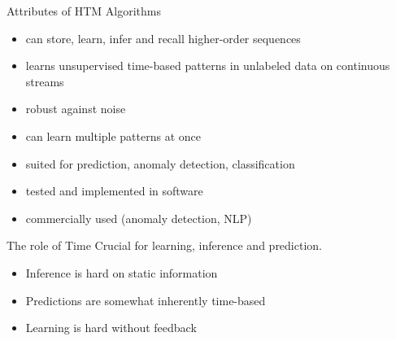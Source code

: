 \begin{frame}[c]{Attributes of HTM Algorithms}
    \begin{itemize}[<+(1)->]
        \item can store, learn, infer and recall higher-order sequences
        \item learns unsupervised time-based patterns in unlabeled data on continuous streams
        \item robust against noise
        \item can learn multiple patterns at once
        \item suited for prediction, anomaly detection, classification
        \item tested and implemented in software
        \item commercially used (anomaly detection, NLP)
    \end{itemize}
\end{frame}



\begin{frame}[c]{The role of Time}
    \Large
    Crucial for learning, inference and prediction.
    \begin{itemize}[<+(1)->]
        \item Inference is hard on static information
        \item Predictions are somewhat inherently time-based
        \item Learning is hard without feedback
    \end{itemize}
\end{frame}




